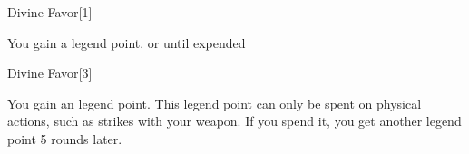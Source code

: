 \begin{spellsection}{Divine Favor}[1]
    \begin{spellheader}
    \end{spellheader}
    \begin{spellcontent}
        \begin{spelltargetinginfo}
        \end{spelltargetinginfo}
        \begin{spelleffects}
            \spelleffect You gain a legend point.
            \spelldur \durshort or until expended
        \end{spelleffects}
    \end{spellcontent}
    \begin{spellfooter}
        \miscastexplode
    \end{spellfooter}
\end{spellsection}

\begin{spellsection}{Divine Favor}[3]
    \begin{spellheader}
    \end{spellheader}
    \begin{spellcontent}
        \begin{spelltargetinginfo}
        \end{spelltargetinginfo}
        \begin{spelleffects}
            \spelleffect You gain an legend point.
            This legend point can only be spent on physical actions, such as strikes with your weapon.
            If you spend it, you get another legend point 5 rounds later.
            \spelldur \durlong \dismissable
        \end{spelleffects}
    \end{spellcontent}
    \begin{spellfooter}
        \miscastexplode
    \end{spellfooter}
\end{spellsection}

